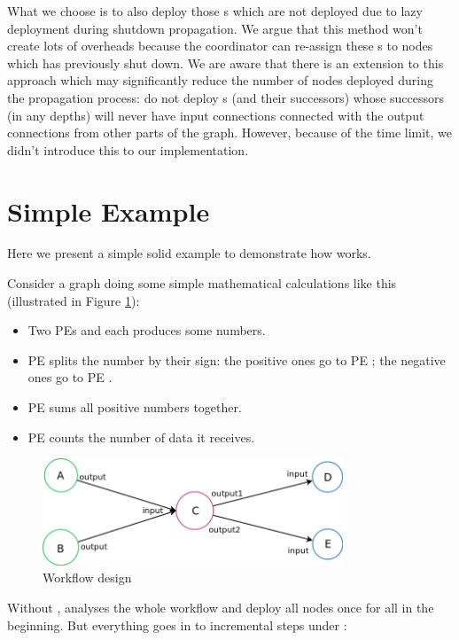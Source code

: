 What we choose is to also deploy those \tPEInst{}s which are not deployed due to lazy deployment during shutdown propagation. We argue that this method won't create lots of overheads because the coordinator can re-assign these \tPEInst{}s to nodes which has previously shut down. We are aware that there is an extension to this approach which may significantly reduce the number of nodes deployed during the propagation process: do not deploy \tPEInst{}s (and their successors) whose successors (in any depths) will never have input connections connected with the output connections from other parts of the graph. However, because of the time limit, we didn't introduce this to our implementation.

\section{Simple Example}
Here we present a simple solid example to demonstrate how \tincdep works.

Consider a graph doing some simple mathematical calculations like this (illustrated in Figure \ref{fig:incdep_example_0}):
  

\begin{itemize}
	\item Two PEs \ndA and \ndB each produces some numbers.
	\item PE \ndC splits the number by their sign: the positive ones go to PE \ndD; the negative ones go to PE \ndE.
	\item PE \ndD sums all positive numbers together.
	\item PE \ndE counts the number of data it receives.
\end{itemize}

\begin{figure}[h]\centering
    \includegraphics[width=0.8\textwidth]{figures/incdep_example_0}
	\caption{Workflow design}
	\label{fig:incdep_example_0}
\end{figure}

Without \tincdep, \dpy analyses the whole workflow and deploy all nodes once for all in the beginning. But everything goes in to incremental steps under \tincdep:

